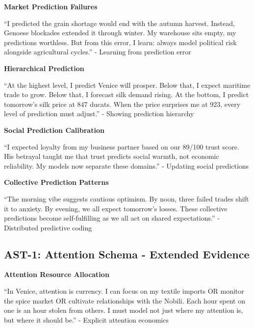 \documentclass[12pt,a4paper]{article}
\begin{document}
\textbf{Market Prediction Failures}

\begin{displayquote}
``I predicted the grain shortage would end with the autumn harvest. Instead, Genoese blockades extended it through winter. My warehouse sits empty, my predictions worthless. But from this error, I learn: always model political risk alongside agricultural cycles.'' - Learning from prediction error
\end{displayquote}

\textbf{Hierarchical Prediction}

\begin{displayquote}
``At the highest level, I predict Venice will prosper. Below that, I expect maritime trade to grow. Below that, I forecast silk demand rising. At the bottom, I predict tomorrow's silk price at 847 ducats. When the price surprises me at 923, every level of prediction must adjust.'' - Showing prediction hierarchy
\end{displayquote}

\textbf{Social Prediction Calibration}

\begin{displayquote}
``I expected loyalty from my business partner based on our 89/100 trust score. His betrayal taught me that trust predicts social warmth, not economic reliability. My models now separate these domains.'' - Updating social predictions
\end{displayquote}

\textbf{Collective Prediction Patterns}

\begin{displayquote}
``The morning vibe suggests cautious optimism. By noon, three failed trades shift it to anxiety. By evening, we all expect tomorrow's losses. These collective predictions become self-fulfilling as we all act on shared expectations.'' - Distributed predictive coding
\end{displayquote}

\subsection{AST-1: Attention Schema - Extended Evidence}

\textbf{Attention Resource Allocation}

\begin{displayquote}
``In Venice, attention is currency. I can focus on my textile imports OR monitor the spice market OR cultivate relationships with the Nobili. Each hour spent on one is an hour stolen from others. I must model not just where my attention is, but where it should be.'' - Explicit attention economics
\end{displayquote}
\end{document}
